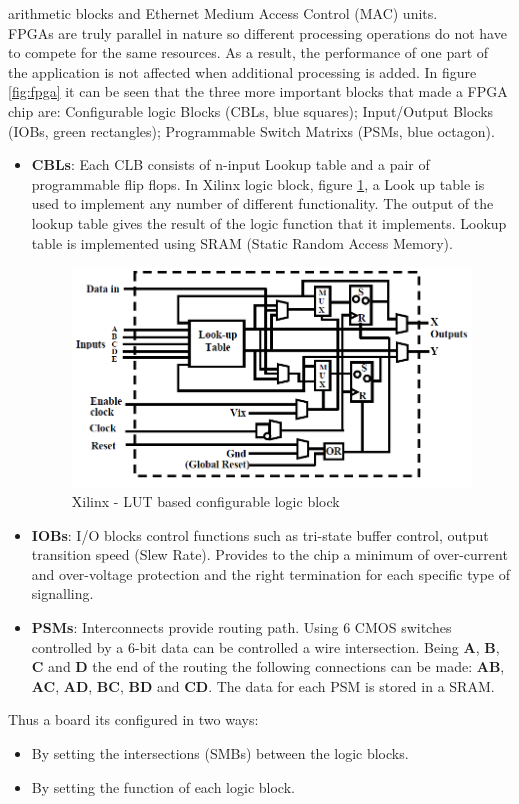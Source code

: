 arithmetic blocks and Ethernet Medium Access Control (MAC) units.
\\
FPGAs are truly parallel in nature so different processing operations do not have to compete for the same resources. As a result, the performance of one part of the application is not affected when additional processing is added.
\newline
\noindent In figure \ref{fig:fpga} it can be seen that the three more important blocks that made a FPGA chip are: Configurable logic Blocks (CBLs, blue squares); Input/Output Blocks (IOBs, green rectangles); Programmable Switch Matrixs (PSMs, blue octagon).
\begin{itemize}
	\item \textbf{CBLs}: Each CLB consists of n-input Lookup table and a pair of programmable flip flops. In Xilinx logic block, figure \ref{fig:clb}, a Look up table is used to implement any number of different functionality. The output of the lookup table gives the result of the logic function that it implements. Lookup table is implemented using SRAM (Static Random Access Memory).
	\begin{figure}[H]
		\centering
		\includegraphics[width=0.7\linewidth]{IMG/ch3/CLB}
		\caption{Xilinx - LUT based configurable logic block}
		\label{fig:clb}
	\end{figure}
	\item \textbf{IOBs}: I/O blocks control functions such as tri-state buffer control, output transition speed (Slew Rate).
	\newline
	Provides to the chip a minimum of over-current and over-voltage protection and the right termination for each specific type of signalling.
	\item \textbf{PSMs}: Interconnects provide routing path. Using 6 CMOS switches controlled by a 6-bit data can be controlled a  wire intersection. Being \textbf{A}, \textbf{B}, \textbf{C} and \textbf{D} the  end of the routing the following connections can be made: \textbf{AB}, \textbf{AC}, \textbf{AD}, \textbf{BC}, \textbf{BD} and \textbf{CD}.
	\newline
	The data for each PSM is stored in a SRAM.
\end{itemize}
\noindent Thus a board its configured in two ways:
\begin{itemize}
	\item By setting the intersections (SMBs) between the logic blocks.
	\item By setting the function of each logic block.
\end{itemize}
